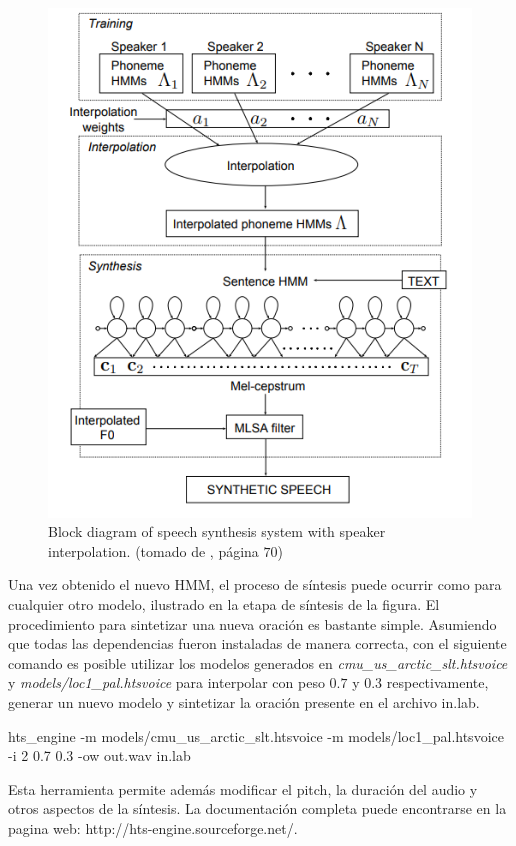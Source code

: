 \begin{figure}
\begin{center}
\includegraphics[scale=0.4]{imagenes/speakerInterpolation.png}
\caption{Block diagram of speech synthesis system with speaker interpolation. (tomado de \cite{phoneticAndProsodic}, página $70$) }
\label{spekerInterpolationImagen}
\end{center}
\end{figure}

Una vez obtenido el nuevo HMM, el proceso de síntesis puede ocurrir como para cualquier otro modelo, ilustrado en la etapa de síntesis de la figura. El procedimiento para sintetizar una nueva oración es bastante simple. Asumiendo que todas las dependencias fueron instaladas de manera correcta, con el siguiente comando es posible utilizar los modelos generados en \textit{cmu\_us\_arctic\_slt.htsvoice} y \textit{models/loc1\_pal.htsvoice} para interpolar con peso $0.7$ y $0.3$ respectivamente, generar un nuevo modelo y sintetizar la oración presente en el archivo in.lab.

\begin{tcolorbox}
hts\_engine -m models/cmu\_us\_arctic\_slt.htsvoice -m models/loc1\_pal.htsvoice -i 2 0.7 0.3 -ow out.wav in.lab
\end{tcolorbox}

Esta herramienta permite además modificar el pitch, la duración del audio y otros aspectos de la síntesis. La documentación completa puede encontrarse en la pagina web: http://hts-engine.sourceforge.net/.